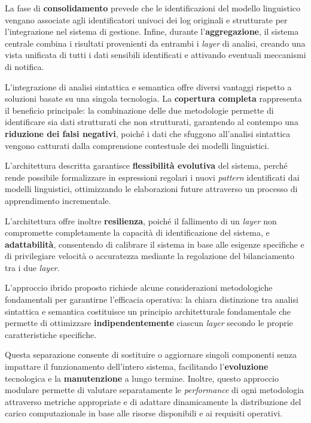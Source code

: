 \documentclass[12pt,twoside]{report}
\begin{document}
La fase di \textbf{consolidamento} prevede che le identificazioni del modello linguistico vengano associate agli identificatori univoci dei log originali e strutturate per l'integrazione nel sistema di gestione. Infine, durante l'\textbf{aggregazione}, il sistema centrale combina i risultati provenienti da entrambi i \textit{layer} di analisi, creando una vista unificata di tutti i dati sensibili identificati e attivando eventuali meccanismi di notifica.

L'integrazione di analisi sintattica e semantica offre diversi vantaggi rispetto a soluzioni basate su una singola tecnologia. La \textbf{copertura completa} rappresenta il beneficio principale: la combinazione delle due metodologie permette di identificare sia dati strutturati che non strutturati, garantendo al contempo una \textbf{riduzione dei falsi negativi}, poiché i dati che sfuggono all'analisi sintattica vengono catturati dalla comprensione contestuale dei modelli linguistici.

L'architettura descritta garantisce \textbf{flessibilità evolutiva} del sistema, perché rende possibile formalizzare in espressioni regolari i nuovi \textit{pattern} identificati dai modelli linguistici, ottimizzando le elaborazioni future attraverso un processo di apprendimento incrementale.

L'architettura offre inoltre \textbf{resilienza}, poiché il fallimento di un \textit{layer} non compromette completamente la capacità di identificazione del sistema, e \textbf{adattabilità}, consentendo di calibrare il sistema in base alle esigenze specifiche e di privilegiare velocità o accuratezza mediante la regolazione del bilanciamento tra i due \textit{layer}.

L'approccio ibrido proposto richiede alcune considerazioni metodologiche fondamentali per garantirne l'efficacia operativa: la chiara distinzione tra analisi sintattica e semantica costituisce un principio architetturale fondamentale che permette di ottimizzare \textbf{indipendentemente} ciascun \textit{layer} secondo le proprie caratteristiche specifiche.

Questa separazione consente di sostituire o aggiornare singoli componenti senza impattare il funzionamento dell'intero sistema, facilitando l'\textbf{evoluzione} tecnologica e la \textbf{manutenzione} a lungo termine. Inoltre, questo approccio modulare permette di valutare separatamente le \textit{performance} di ogni metodologia attraverso metriche appropriate e di adattare dinamicamente la distribuzione del carico computazionale in base alle risorse disponibili e ai requisiti operativi.
\end{document}
